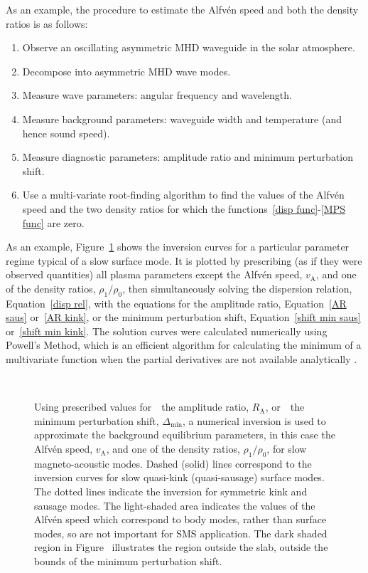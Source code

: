 \documentclass[12pt]{../style-files/ociamthesis}
\newcommand{\figdir}{../main/figures/chpt-5/} %
\begin{document}
As an example, the procedure to estimate the Alfv\'{e}n speed and both the density ratios is as follows:
\begin{enumerate}
	\item Observe an oscillating asymmetric MHD waveguide in the solar atmosphere.
	\item Decompose into asymmetric MHD wave modes.
	\item Measure wave parameters: angular frequency and wavelength.
	\item Measure background parameters: waveguide width and temperature (and hence sound speed).
	\item Measure diagnostic parameters: amplitude ratio and minimum perturbation shift.
	\item Use a multi-variate root-finding algorithm to find the values of the Alfv\'{e}n speed and the two density ratios for which the functions~\eqref{disp func}-\eqref{MPS func} are zero.
\end{enumerate}

As an example, Figure~\ref{fig: vA approx} shows the inversion curves for a particular parameter regime typical of a slow surface mode. It is plotted by prescribing (as if they were observed quantities) all plasma parameters except the Alfv\'{e}n speed, $v_\textrm{A}$, and one of the density ratios, $\rho_1/\rho_0$, then simultaneously solving the dispersion relation, Equation~\eqref{disp rel}, with the equations for the amplitude ratio, Equation~\eqref{AR saus} or~\eqref{AR kink}, or the minimum perturbation shift, Equation~\eqref{shift min saus} or~\eqref{shift min kink}. The solution curves were calculated numerically using Powell's Method, which is an efficient algorithm for calculating the minimum of a multivariate function when the partial derivatives are not available analytically \citep{pow64}.

\begin{figure}
	\centering
	 \\
	\caption{Using prescribed values for~\protect{}~the amplitude ratio, $R_\textrm{A}$, or~\protect{}~the minimum perturbation shift, $\Delta_\textrm{min}$, a numerical inversion is used to approximate the background equilibrium parameters, in this case the Alfv\'{e}n speed, $v_\textrm{A}$, and one of the density ratios, $\rho_1 / \rho_0$, for slow magneto-acoustic modes. Dashed (solid) lines correspond to the inversion curves for slow quasi-kink (quasi-sausage) surface modes. The dotted lines indicate the inversion for symmetric kink and sausage modes. The light-shaded area indicates the values of the Alfv\'{e}n speed which correspond to body modes, rather than surface modes, so are not important for SMS application. The dark shaded region in Figure~\protect{} illustrates the region outside the slab, outside the bounds of the minimum perturbation shift.}
	\label{fig: vA approx}
\end{figure}
\end{document}
